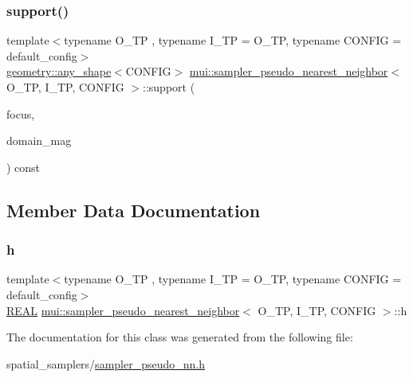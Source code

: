 \mbox{\label{classmui_1_1sampler__pseudo__nearest__neighbor_a5aad2d99fad3163250b4cdaa85169021}} 
\subsubsection{\texorpdfstring{support()}{support()}}
{\footnotesize\ttfamily template$<$typename O\+\_\+\+TP , typename I\+\_\+\+TP  = O\+\_\+\+TP, typename C\+O\+N\+F\+IG  = default\+\_\+config$>$ \\
\hyperlink{classmui_1_1geometry_1_1any__shape}{geometry\+::any\+\_\+shape}$<$C\+O\+N\+F\+IG$>$ \hyperlink{classmui_1_1sampler__pseudo__nearest__neighbor}{mui\+::sampler\+\_\+pseudo\+\_\+nearest\+\_\+neighbor}$<$ O\+\_\+\+TP, I\+\_\+\+TP, C\+O\+N\+F\+IG $>$\+::support (\begin{DoxyParamCaption}\item[{\hyperlink{classmui_1_1sampler__pseudo__nearest__neighbor_ab639810d9409c0e3fea48d950d6cfe59}{point\+\_\+type}}]{focus,  }\item[{\hyperlink{classmui_1_1sampler__pseudo__nearest__neighbor_ab053986c2affe4523f82f14e832a259e}{R\+E\+AL}}]{domain\+\_\+mag }\end{DoxyParamCaption}) const\hspace{0.3cm}{\ttfamily [inline]}}



\subsection{Member Data Documentation}
\mbox{\label{classmui_1_1sampler__pseudo__nearest__neighbor_ae112902d0fbaa838ee0ce2ee2f3cbcb6}} 
\subsubsection{\texorpdfstring{h}{h}}
{\footnotesize\ttfamily template$<$typename O\+\_\+\+TP , typename I\+\_\+\+TP  = O\+\_\+\+TP, typename C\+O\+N\+F\+IG  = default\+\_\+config$>$ \\
\hyperlink{classmui_1_1sampler__pseudo__nearest__neighbor_ab053986c2affe4523f82f14e832a259e}{R\+E\+AL} \hyperlink{classmui_1_1sampler__pseudo__nearest__neighbor}{mui\+::sampler\+\_\+pseudo\+\_\+nearest\+\_\+neighbor}$<$ O\+\_\+\+TP, I\+\_\+\+TP, C\+O\+N\+F\+IG $>$\+::h\hspace{0.3cm}{\ttfamily [protected]}}



The documentation for this class was generated from the following file\+:\begin{DoxyCompactItemize}
\item 
spatial\+\_\+samplers/\hyperlink{sampler__pseudo__nn_8h}{sampler\+\_\+pseudo\+\_\+nn.\+h}\end{DoxyCompactItemize}
